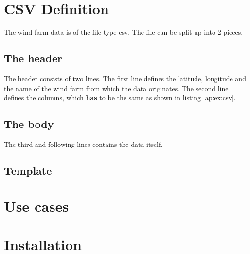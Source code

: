 %
%

\chapter{CSV Definition}
\label{ap:csv}
The wind farm data is of the file type csv. The file can be split up into 2 pieces.
\section{The header}
The header consists of two lines. The first line defines the latitude, longitude and the name of the wind farm from which the data originates.
The second line defines the columns, which \textbf{has} to be the same as shown in listing \ref{ap:ex:csv}.

\section{The body}
The third and following lines contains the data itself.

\section{Template}


\chapter{Use cases}
\label{ap:usecase}


\chapter{Installation}
\label{ap:installation}
